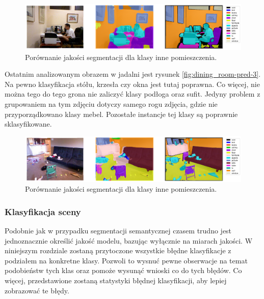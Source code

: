 \begin{figure}[ht!]
    \centering
    \includegraphics[width=\textwidth]{img/preds_analysis/gt_vs_pred/other_indoor-2.png}
    \caption{Porównanie jakości segmentacji dla klasy inne pomieszczenia.}
    \label{fig:other_indoor-pred-2}
\end{figure}


Ostatnim analizowanym obrazem w jadalni jest rysunek \ref{fig:dining_room-pred-3}. Na pewno klasyfikacja stółu, krzesła czy okna jest tutaj poprawna. Co więcej, nie można tego do tego grona nie zaliczyć klasy podłoga oraz sufit. Jedyny problem z grupowaniem na tym zdjęciu dotyczy samego rogu zdjęcia, gdzie nie przyporządkowano klasy mebel. Pozostałe instancje tej klasy są poprawnie sklasyfikowane.

\begin{figure}[ht!]
    \centering
    \includegraphics[width=\textwidth]{img/preds_analysis/gt_vs_pred/other_indoor-3.png}
    \caption{Porównanie jakości segmentacji dla klasy inne pomieszczenia.}
    \label{fig:other_indoor-pred-3}
\end{figure}

\subsubsection{Klasyfikacja sceny}
Podobnie jak w przypadku segmentacji semantycznej czasem trudno jest jednoznacznie określić jakość modelu, bazując wyłącznie na miarach jakości. W niniejszym rozdziale zostaną przytoczone wszystkie błędne klasyfikacje z podziałem na konkretne klasy. Pozwoli to wysnuć pewne obserwacje na temat podobieństw tych klas oraz pomoże wysunąć wnioski co do tych błędów. Co więcej, przedstawione zostaną statystyki błędnej klasyfikacji, aby lepiej zobrazować te błędy.

